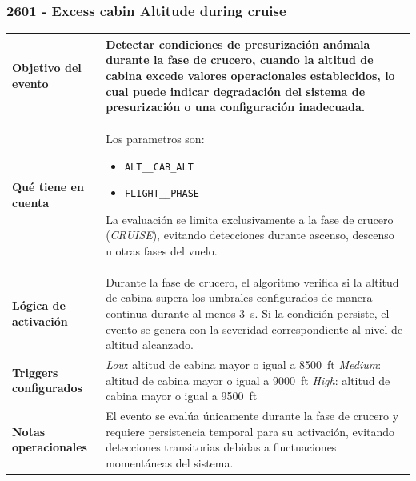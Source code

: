 \documentclass[11pt,a4paper]{article}
\begin{document}
	\subsubsection{2601 - Excess cabin Altitude during cruise}
	\begin{table}[H]
		\centering
		\renewcommand{\arraystretch}{1.3}
		\begin{tabular}{p{5cm} p{9.5cm}}
			\hline
			\textbf{Objetivo del evento} &
			Detectar condiciones de presurización anómala durante la fase de crucero, cuando la altitud de cabina excede valores operacionales establecidos, lo cual puede indicar degradación del sistema de presurización o una configuración inadecuada. \\
			\hline
			\textbf{Qué tiene en cuenta} & Los parametros son:
			\begin{itemize}
				\item \texttt{ALT\_\_CAB\_ALT}
				\item \texttt{FLIGHT\_\_PHASE}
			\end{itemize}
			La evaluación se limita exclusivamente a la fase de crucero (\textit{CRUISE}), evitando detecciones durante ascenso, descenso u otras fases del vuelo. \\
			\hline
			\textbf{Lógica de activación} &
			Durante la fase de crucero, el algoritmo verifica si la altitud de cabina supera los umbrales configurados de manera continua durante al menos \SI{3}{\second}. Si la condición persiste, el evento se genera con la severidad correspondiente al nivel de altitud alcanzado. \\
			\hline
			\textbf{Triggers configurados} &
			\textit{Low}: altitud de cabina mayor o igual a \SI{8500}{ft} \newline
			\textit{Medium}: altitud de cabina mayor o igual a \SI{9000}{ft} \newline
			\textit{High}: altitud de cabina mayor o igual a \SI{9500}{ft} \\
			\hline
			\textbf{Notas operacionales} &
			El evento se evalúa únicamente durante la fase de crucero y requiere persistencia temporal para su activación, evitando detecciones transitorias debidas a fluctuaciones momentáneas del sistema. \\
			\hline
		\end{tabular}
	\end{table}
\end{document}
